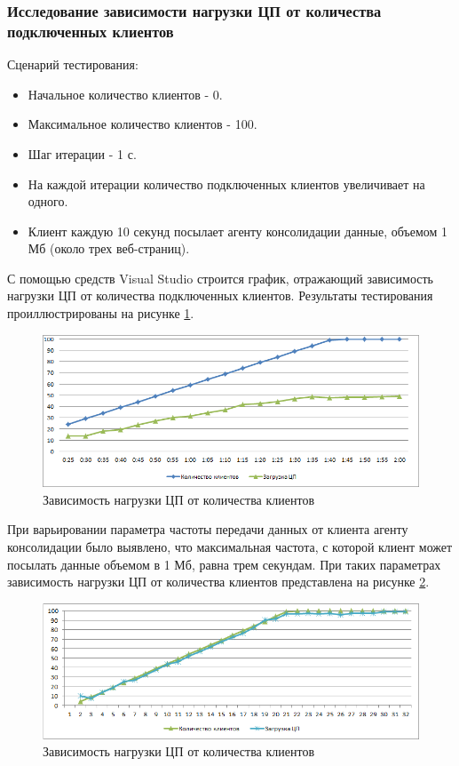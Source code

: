 \documentclass[russian, utf8, emptystyle]{eskdtext}
\begin{document}
\subsubsection {Исследование зависимости нагрузки ЦП от количества подключенных клиентов}
\label{test1}
Сценарий тестирования:
\begin{itemize}
	\item Начальное количество клиентов - 0. 
	\item Максимальное количество клиентов - 100.
	\item Шаг итерации - 1 с.
	\item На каждой итерации количество подключенных клиентов увеличивает на одного.
	\item Клиент каждую 10 секунд посылает агенту консолидации данные, объемом 1 Мб (около трех веб-страниц).
\end{itemize}

С помощью средств Visual Studio строится график, отражающий зависимость нагрузки ЦП от количества подключенных клиентов.
Результаты тестирования проиллюстрированы на рисунке \ref{fig:test1}.
 \begin{figure}[h]
 	\begin{center}
 		\includegraphics[width=12cm]{pic/test1.png}
 		\caption{Зависимость нагрузки ЦП от количества клиентов}
 		\label{fig:test1}
 	\end{center}
 \end{figure}
 
 При варьировании параметра частоты передачи данных от клиента агенту консолидации было выявлено, что максимальная частота, с которой клиент может посылать данные объемом в 1 Мб, равна трем секундам. При таких параметрах зависимость нагрузки ЦП от количества клиентов представлена на рисунке \ref{fig:test3}.
 \begin{figure}[h]
 	\begin{center}
 		\includegraphics[width=12cm]{pic/test3.png}
 		\caption{Зависимость нагрузки ЦП от количества клиентов}
 		\label{fig:test3}
 	\end{center}
 \end{figure}
 
\end{document}
